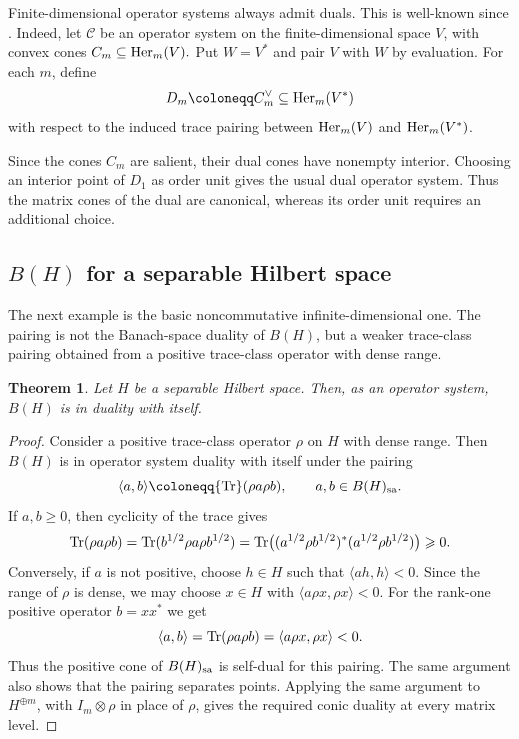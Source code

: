 \documentclass[11pt,onecolumn]{article}
\theoremstyle{plain}
\newtheorem{theorem}{Theorem}[section]
\theoremstyle{definition}
\begin{document}
Finite-dimensional operator systems always admit duals. This is well-known since \cite{ChoiEffros1977}. Indeed, let
$\mathcal C$ be an operator system on the finite-dimensional space $V$, with convex cones $C_m\subseteq{\rm Her}_m(V).$ Put
$W=V^*$ and pair $V$ with $W$ by evaluation.  For each $m$, define
\[
    D_m\coloneqq C_m^\vee
    \subseteq {\rm Her}_m(V^*)
\]
with respect to the induced trace pairing between ${\rm Her}_m(V)$ and
${\rm Her}_m(V^*)$.

Since the cones $C_m$ are salient, their dual cones have nonempty interior.
Choosing an interior point of $D_1$ as order unit gives the usual dual
operator system. Thus the matrix cones of the dual are canonical, whereas its
order unit requires an additional choice.

\subsection{\texorpdfstring{$B(H)$ for a  separable Hilbert space}{B(H) for a Separable Hilbert space}}

The next example is the basic noncommutative infinite-dimensional one.  The
pairing is not the Banach-space duality of $B(H)$, but a weaker trace-class
pairing obtained from a positive trace-class operator with dense range.

\begin{theorem}
\label{thm:bh}
     Let $H$ be a separable Hilbert space. Then, as an operator system, $B(H)$ is in duality with itself.
\end{theorem}
\begin{proof}
   Consider a positive trace-class operator $\rho$ on $H$ with dense range. 
   Then $B(H)$ is in operator system duality with itself under the pairing
    \[
        \langle a,b\rangle
        \coloneqq{\rm Tr}(\rho a\rho b),
        \qquad a,b\in B(H)_{\rm sa}.
    \]
     If $a,b\geqslant 0$, then cyclicity of the trace gives
     \[
        {\rm Tr}(\rho a\rho b)
        ={\rm Tr}(b^{1/2}\rho a\rho b^{1/2})
        ={\rm Tr}\bigl((a^{1/2}\rho b^{1/2})^*
        (a^{1/2}\rho b^{1/2})\bigr)\geqslant 0.
     \]
    Conversely, if $a$ is not positive, choose $h\in H$ such that $\langle ah,h\rangle<0$.  
    Since the range of $\rho$ is dense, we may choose $x\in H$ with $\langle a\rho x,\rho x\rangle<0$. 
    For the rank-one positive operator $b=xx^*$ we get
    \[
        \langle a,b\rangle={\rm Tr}(\rho a\rho b)   =\langle a\rho x,\rho x\rangle<0.
    \]
    Thus the positive cone of $B(H)_{\rm sa}$ is self-dual for this pairing. The same argument also shows that the pairing separates points.
    Applying the same argument to $H^{\oplus m}$, with $I_m\otimes\rho$ in place of $\rho$, gives the required conic duality at every matrix level.
\end{proof}
\end{document}
